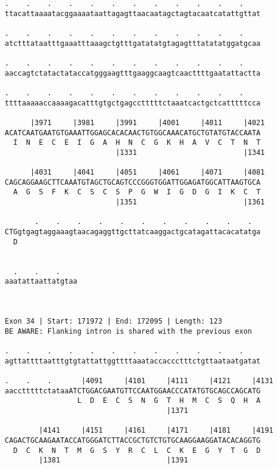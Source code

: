 \documentclass{article}
\begin{document}
\begin{Verbatim}
.    .    .    .    .    .    .    .    .    .    .    .    
ttacattaaaatacggaaaataattagagttaacaatagctagtacaatcatattgttat
                                                            
.    .    .    .    .    .    .    .    .    .    .    .    
atctttataatttgaaatttaaagctgtttgatatatgtagagtttatatatggatgcaa
                                                            
.    .    .    .    .    .    .    .    .    .    .    .    
aaccagtctatactataccatgggaagtttgaaggcaagtcaacttttgaatattactta
                                                            
.    .    .    .    .    .    .    .    .    .    .    .    
ttttaaaaaccaaaagacatttgtgctgagcctttttctaaatcactgctcatttttcca
                                                            
      |3971     |3981     |3991     |4001     |4011     |4021
ACATCAATGAATGTGAAATTGGAGCACACAACTGTGGCAAACATGCTGTATGTACCAATA
  I  N  E  C  E  I  G  A  H  N  C  G  K  H  A  V  C  T  N  T
                          |1331                         |1341
  
      |4031     |4041     |4051     |4061     |4071     |4081
CAGCAGGAAGCTTCAAATGTAGCTGCAGTCCCGGGTGGATTGGAGATGGCATTAAGTGCA
  A  G  S  F  K  C  S  C  S  P  G  W  I  G  D  G  I  K  C  T
                          |1351                         |1361
  
       .    .    .    .    .    .    .    .    .    .    .  
CTGgtgagtaggaaagtaacagaggttgcttatcaaggactgcatagattacacatatga
  D                                                         
                                                            
  
  .    .    .    
aaatattaattatgtaa
                 
                 
 
Exon 34 | Start: 171972 | End: 172095 | Length: 123
BE AWARE: Flanking intron is shared with the previous exon
 
.    .    .    .    .    .    .    .    .    .    .    .    
agttattttaatttgtgtattattggttttaaataccaccctttctgttaataatgatat
                                                            
.    .    .       |4091     |4101     |4111     |4121     |4131
aacctttttctataaATCTGGACGAATGTTCCAATGGAACCCATATGTGCAGCCAGCATG
                 L  D  E  C  S  N  G  T  H  M  C  S  Q  H  A
                                      |1371                 
  
        |4141     |4151     |4161     |4171     |4181     |4191
CAGACTGCAAGAATACCATGGGATCTTACCGCTGTCTGTGCAAGGAAGGATACACAGGTG
  D  C  K  N  T  M  G  S  Y  R  C  L  C  K  E  G  Y  T  G  D
        |1381                         |1391                 
  

\end{Verbatim}
\end{document}
